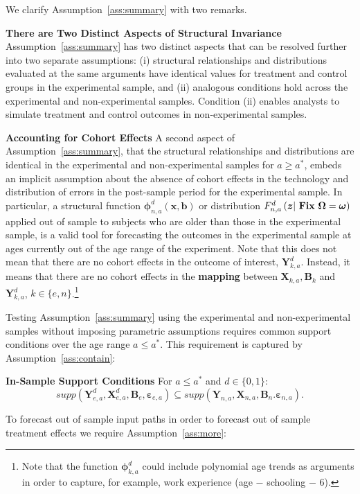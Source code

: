 We clarify Assumption~\ref{ass:summary} with two remarks.

\begin{remark} \textbf{There are Two Distinct Aspects of Structural Invariance}
Assumption~\ref{ass:summary} has two distinct aspects that can be resolved further into two separate assumptions: (i) structural relationships and distributions evaluated at the same arguments have identical values for treatment and control groups in the experimental sample, and (ii) analogous conditions hold across the experimental and non-experimental samples. Condition (ii) enables analysts to simulate treatment and control outcomes in non-experimental samples.
\end{remark}

\begin{remark} \label{remark:cohort} \textbf{Accounting for Cohort Effects}
A second aspect of Assumption~\ref{ass:summary}, that the structural relationships and distributions are identical in the experimental and non-experimental samples for $a\geq a^*$, embeds an implicit assumption about the absence of cohort effects in the technology and distribution of errors in the post-sample period for the experimental sample. In particular, a structural function $\bm{\phi}_{n,a}^d \left( \bm{x}, \bm{b} \right)$ or distribution $F^d_{n,a} \left(\bm{z} | \text{ \text{\textbf{Fix}} } \bm{\Omega} = \bm{\omega}\right)$ applied out of sample to subjects who are older than those in the experimental sample, is a valid tool for forecasting the outcomes in the experimental sample at ages currently out of the age range of the experiment. Note that this does not mean that there are no cohort effects in the outcome of interest, $\bm{Y}^d_{k,a}$. Instead, it means that there are no cohort effects in the \textbf{mapping} between $\bm{X}_{k,a}, \bm{B}_k$ and $\bm{Y}_{k,a}^d$, $k \in \{e,n\}$.\footnote{Note that the function $\bm{\phi}_{k,a}^d$ could include polynomial age trends as arguments in order to capture, for example, work experience (age $-$ schooling $-$ 6).}
\end{remark}

\doublespacing
Testing Assumption~\ref{ass:summary} using the experimental and non-experimental samples without imposing parametric assumptions requires common support conditions over the age range $a \leq a^*$. This requirement is captured by Assumption~\ref{ass:contain}: 

\onehalfspacing
\begin{assumption} \textbf{In-Sample Support Conditions} \label{ass:contain}
For $a \leq a^*$ and $d \in \{ 0 , 1 \}$:
\begin{equation}
supp( \bm{Y}_{e,a}^d, \bm{X}^d_{e,a}, \bm{B}_e, \bm{\varepsilon}_{e,a} ) \subseteq supp( \bm{Y}_{n,a}, \bm{X}_{n,a}, \bm{B}_n. \bm{\varepsilon}_{n,a} ). \label{eq:what}
\end{equation}
\end{assumption}
To forecast out of sample input paths in order to forecast out of sample treatment effects we require Assumption~\ref{ass:more}:


